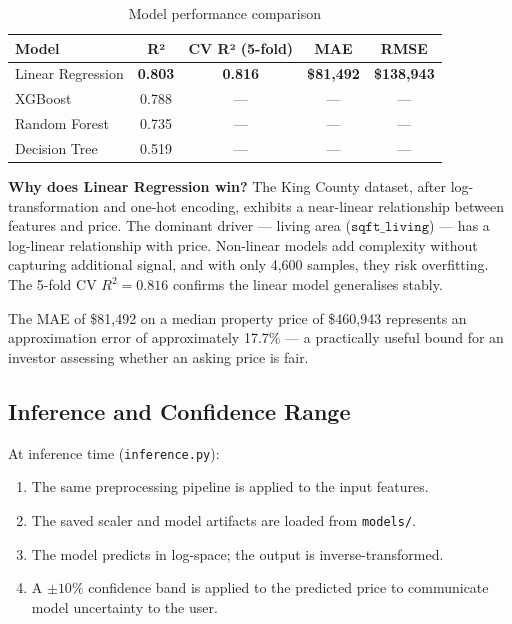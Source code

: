 \documentclass[12pt, a4paper]{article}
\begin{document}
\begin{table}[H]
\centering
\caption{Model performance comparison}
\begin{tabular}{lcccc}
  \toprule
  \textbf{Model}      & \textbf{R²}   & \textbf{CV R² (5-fold)} & \textbf{MAE}      & \textbf{RMSE}      \\
  \midrule
  Linear Regression   & \textbf{0.803} & \textbf{0.816}         & \textbf{\$81,492} & \textbf{\$138,943} \\
  XGBoost             & 0.788          & ---                     & ---               & ---                \\
  Random Forest       & 0.735          & ---                     & ---               & ---                \\
  Decision Tree       & 0.519          & ---                     & ---               & ---                \\
  \bottomrule
\end{tabular}
\end{table}

\textbf{Why does Linear Regression win?} The King County dataset, after
log-transformation and one-hot encoding, exhibits a near-linear relationship
between features and price. The dominant driver --- living area ($\texttt{sqft\_living}$)
--- has a log-linear relationship with price. Non-linear models add complexity without
capturing additional signal, and with only 4,600 samples, they risk overfitting.
The 5-fold CV $R^2 = 0.816$ confirms the linear model generalises stably.

The MAE of \$81,492 on a median property price of \$460,943 represents an
approximation error of approximately 17.7\% --- a practically useful bound for
an investor assessing whether an asking price is fair.

\subsection{Inference and Confidence Range}

At inference time (\texttt{inference.py}):
\begin{enumerate}[leftmargin=1.6em]
  \item The same preprocessing pipeline is applied to the input features.
  \item The saved scaler and model artifacts are loaded from \texttt{models/}.
  \item The model predicts in log-space; the output is inverse-transformed.
  \item A $\pm 10\%$ confidence band is applied to the predicted price to communicate
        model uncertainty to the user.
\end{enumerate}
\end{document}
